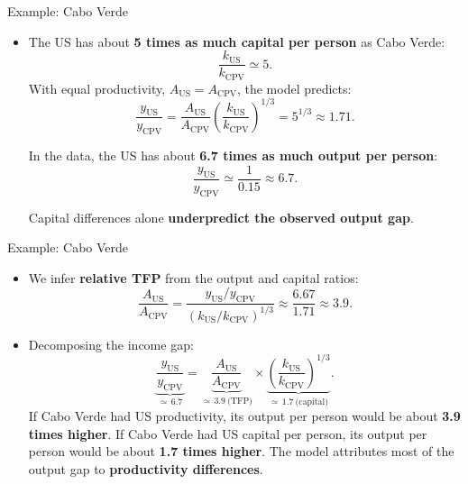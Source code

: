 \documentclass[10pt,aspectratio=169]{beamer}
\begin{document}
\begin{frame}{Example: Cabo Verde}

\begin{itemize}
\item The US has about \textbf{5 times as much capital per person} as Cabo Verde:
\[
\frac{k_{\text{US}}}{k_{\text{CPV}}} \simeq 5.
\]
\itemvso With equal productivity, \(A_{\text{US}}=A_{\text{CPV}}\), the model predicts:
\[
\frac{y_{\text{US}}}{y_{\text{CPV}}}
= \frac{A_{\text{US}}}{A_{\text{CPV}}}
  \left(\frac{k_{\text{US}}}{k_{\text{CPV}}}\right)^{1/3}
= 5^{1/3} \approx 1.71.
\]

\itemvso In the data, the US has about \textbf{6.7 times as much output per person}:
\[
\frac{y_{\text{US}}}{y_{\text{CPV}}} \simeq \frac{1}{0.15} \approx 6.7.
\]

\itemvso Capital differences alone \textbf{underpredict the observed output gap}.

\end{itemize}

\end{frame}

\begin{frame}{Example: Cabo Verde}

\begin{itemize}

\item We infer \textbf{relative TFP} from the output and capital ratios:
\[
\frac{A_{\text{US}}}{A_{\text{CPV}}}
= \frac{y_{\text{US}}/y_{\text{CPV}}}
       {\left(k_{\text{US}}/k_{\text{CPV}}\right)^{1/3}}
\approx \frac{6.67}{1.71} \approx 3.9.
\]

\item Decomposing the income gap:
\[
\underbrace{\frac{y_{\text{US}}}{y_{\text{CPV}}}}_{\simeq\,6.7}
= \underbrace{\frac{A_{\text{US}}}{A_{\text{CPV}}}}_{\simeq\,3.9\ \text{(TFP)}}
\times \underbrace{\left(\frac{k_{\text{US}}}{k_{\text{CPV}}}\right)^{1/3}}_{\simeq\,1.7\ \text{(capital)}}.
\]
\itemvso If Cabo Verde had US productivity, its output per person would be about
\textbf{3.9 times higher}.
\itemvso If Cabo Verde had US capital per person, its output per person would be about
\textbf{1.7 times higher}.
\itemvso The model attributes most of the output gap to \textbf{productivity differences}.

\end{itemize}

\end{frame}
\end{document}
